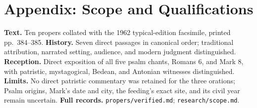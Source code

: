 \section*{Appendix: Scope and Qualifications}

\begin{studyframe}
\textbf{Text.} Ten propers collated with the 1962 typical-edition facsimile, printed pp.~384--385. \textbf{History.} Seven direct passages in canonical order; traditional attribution, narrated setting, audience, and modern judgment distinguished. \textbf{Reception.} Direct exposition of all five psalm chants, Romans 6, and Mark 8, with patristic, mystagogical, Bedean, and Antonian witnesses distinguished. \textbf{Limits.} No direct patristic commentary was retained for the three orations; Psalm origins, Mark's date and city, the feeding's exact site, and its civil year remain uncertain. \textbf{Full records.} \nolinkurl{propers/verified.md}; \nolinkurl{research/scope.md}.
\end{studyframe}

